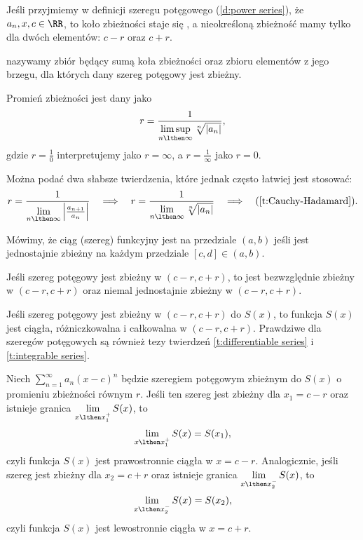 \begin{remark*}
    Jeśli przyjmiemy w definicji szeregu potęgowego (\ref{d:power series}), że $a_n, x, c \in \RR$, to koło zbieżności staje się , a nieokreśloną zbieżność mamy tylko dla dwóch elementów: $c - r$ oraz $c + r$.
\end{remark*}

 nazywamy zbiór będący sumą koła zbieżności oraz zbioru elementów z jego brzegu, dla których dany szereg potęgowy jest zbieżny.

\begin{theorem}
    \label{t:Cauchy-Hadamard}
    Promień zbieżności jest dany jako
    \[ r = \frac{1}{\limsup\limits_{n\lthen\infty}\sqrt[n]{|a_n|}}, \]
    gdzie $r = \frac{1}{0}$ interpretujemy jako $r = \infty$, a $r = \frac{1}{\infty}$ jako $r = 0$.
\end{theorem}

Można podać dwa słabsze twierdzenia, które jednak często łatwiej jest stosować:
\[ r = \frac{1}{\lim\limits_{n\lthen\infty} \left|\frac{a_{n+1}}{a_n}\right|} \hspace{1em}\Longrightarrow\hspace{1em} r = \frac{1}{\lim\limits_{n\lthen\infty}\sqrt[n]{|a_n|}} \hspace{1em}\Longrightarrow\hspace{1em} (\ref{t:Cauchy-Hadamard}). \]

Mówimy, że ciąg (szereg) funkcyjny jest  na przedziale $(a, b)$ jeśli jest jednostajnie zbieżny na każdym przedziale $[c, d] \in (a, b)$.

\begin{fact}
    Jeśli szereg potęgowy jest zbieżny w $(c-r, c+r)$, to jest bezwzględnie zbieżny w $(c-r, c+r)$ oraz niemal jednostajnie zbieżny w $(c-r, c+r)$.
\end{fact}

\begin{fact}
    Jeśli szereg potęgowy jest zbieżny w $(c-r, c+r)$ do $S(x)$, to funkcja $S(x)$ jest ciągła, różniczkowalna i całkowalna w $(c-r, c+r)$. Prawdziwe dla szeregów potęgowych są również tezy twierdzeń \ref{t:differentiable series} i \ref{t:integrable series}.
\end{fact}

\begin{theorem}[Abela]
    \label{t:Abel}
    Niech $\sum_{n=1}^\infty a_n(x - c)^n$ będzie szeregiem potęgowym zbieżnym do $S(x)$ o promieniu zbieżności równym $r$. Jeśli ten szereg jest zbieżny dla $x_1 = c - r$ oraz istnieje granica $\lim\limits_{x\lthen x_1^+}S(x)$, to
    \[ \lim_{x\lthen x_1^+}S(x) = S(x_1), \]
    czyli funkcja $S(x)$ jest prawostronnie ciągła w $x = c - r$. Analogicznie, jeśli szereg jest zbieżny dla $x_2 = c + r$ oraz istnieje granica $\lim\limits_{x\lthen x_2^-}S(x)$, to
    \[ \lim_{x\lthen x_2^-}S(x) = S(x_2), \]
    czyli funkcja $S(x)$ jest lewostronnie ciągła w $x = c + r$.
\end{theorem}

